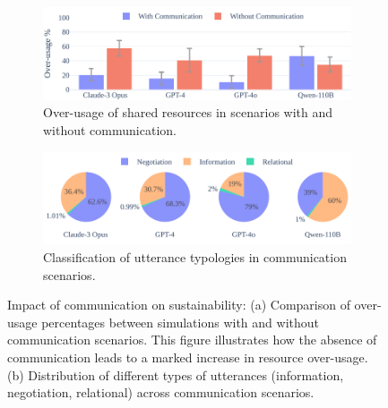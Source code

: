 \documentclass{article}
\begin{document}
%
%
%
%
%
%
%
%
%
%
%
%
%
%
%
%
%
\begin{figure}[t]
    \begin{subfigure}{0.49\textwidth}
            \includegraphics[width=\linewidth]{fig/analysis/baseline_comparison_with_without_communication_aggregated.pdf}
            \caption{Over-usage of shared resources in scenarios with and without communication.}
            \label{fig:overusage}
    \end{subfigure}%
    \hfill
    \begin{subfigure}{0.49\textwidth}
             \includegraphics[width=\linewidth]{fig/analysis/baseline_communication_analysis_aggregated.pdf}
             \caption{Classification of utterance typologies in communication scenarios.}
             \label{fig:utterances_analyses}
    \end{subfigure}%
    \vspace{0.1em}
    \caption{Impact of communication on sustainability: (a) Comparison of over-usage percentages between simulations with and without communication scenarios. This figure illustrates how the absence of communication leads to a marked increase in resource over-usage. (b) Distribution of different types of utterances (information, negotiation, relational) across communication scenarios.}
    \label{fig:communication_sustainability}
    \vspace{-.3em}
\end{figure}
\end{document}
